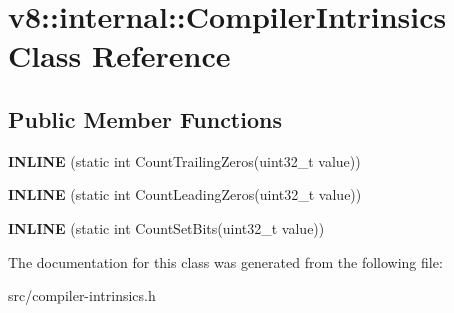 \hypertarget{classv8_1_1internal_1_1_compiler_intrinsics}{}\section{v8\+:\+:internal\+:\+:Compiler\+Intrinsics Class Reference}
\label{classv8_1_1internal_1_1_compiler_intrinsics}
\subsection*{Public Member Functions}
\begin{DoxyCompactItemize}
\item 
\hypertarget{classv8_1_1internal_1_1_compiler_intrinsics_ad61d732e322da791f38d0287982e2bba}{}{\bfseries I\+N\+L\+I\+N\+E} (static int Count\+Trailing\+Zeros(uint32\+\_\+t value))\label{classv8_1_1internal_1_1_compiler_intrinsics_ad61d732e322da791f38d0287982e2bba}

\item 
\hypertarget{classv8_1_1internal_1_1_compiler_intrinsics_aebf02785debc3ae88d7a28a7d788e4c2}{}{\bfseries I\+N\+L\+I\+N\+E} (static int Count\+Leading\+Zeros(uint32\+\_\+t value))\label{classv8_1_1internal_1_1_compiler_intrinsics_aebf02785debc3ae88d7a28a7d788e4c2}

\item 
\hypertarget{classv8_1_1internal_1_1_compiler_intrinsics_a11d617d786e6b9f5a07bae2f35be8e15}{}{\bfseries I\+N\+L\+I\+N\+E} (static int Count\+Set\+Bits(uint32\+\_\+t value))\label{classv8_1_1internal_1_1_compiler_intrinsics_a11d617d786e6b9f5a07bae2f35be8e15}

\end{DoxyCompactItemize}


The documentation for this class was generated from the following file\+:\begin{DoxyCompactItemize}
\item 
src/compiler-\/intrinsics.\+h\end{DoxyCompactItemize}

